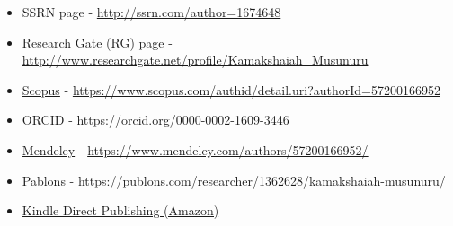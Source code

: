 \documentclass[10pt]{article}
\begin{document}
\begin{itemize} 
\item SSRN page  - \url{http://ssrn.com/author=1674648} 
\item Research Gate (RG) page - \url{http://www.researchgate.net/profile/Kamakshaiah_Musunuru} 
\item \href{https://www.scopus.com/authid/detail.uri?authorId=57200166952}{Scopus} - \url{https://www.scopus.com/authid/detail.uri?authorId=57200166952}
\item \href{https://orcid.org/0000-0002-1609-3446}{ORCID} - \url{https://orcid.org/0000-0002-1609-3446}
\item \href{https://www.mendeley.com/authors/57200166952/}{Mendeley} - \url{https://www.mendeley.com/authors/57200166952/}
\item \href{https://publons.com/researcher/1362628/kamakshaiah-musunuru/}{Pablons} - \url{https://publons.com/researcher/1362628/kamakshaiah-musunuru/}
\item \href{https://www.amazon.com/stores/Kamakshaiah-Musunuru/author/B08C7SVM7V}{Kindle Direct Publishing (Amazon)}

\end{itemize} 
\end{document}
